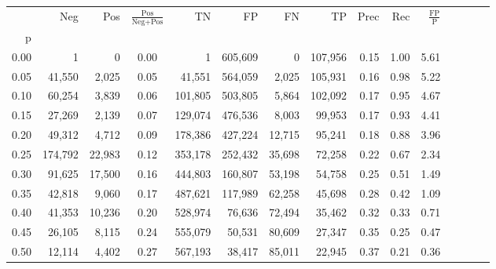 \begin{tabular}{rrrcrrrrrrrrrrr}
\toprule
{} &      Neg &     Pos & $\frac{\text{Pos}}{\text{Neg}+\text{Pos}}$ &       TN &       FP &       FN &       TP &  Prec &   Rec & $\frac{\text{FP}}{\text{P}}$ \\
p    &          &         &                                            &          &          &          &          &       &       &                              \\
\midrule
0.00 &        1 &       0 &                                       0.00 &        1 &  605,609 &        0 &  107,956 &  0.15 &  1.00 &                         5.61 \\
0.05 &   41,550 &   2,025 &                                       0.05 &   41,551 &  564,059 &    2,025 &  105,931 &  0.16 &  0.98 &                         5.22 \\
0.10 &   60,254 &   3,839 &                                       0.06 &  101,805 &  503,805 &    5,864 &  102,092 &  0.17 &  0.95 &                         4.67 \\
0.15 &   27,269 &   2,139 &                                       0.07 &  129,074 &  476,536 &    8,003 &   99,953 &  0.17 &  0.93 &                         4.41 \\
0.20 &   49,312 &   4,712 &                                       0.09 &  178,386 &  427,224 &   12,715 &   95,241 &  0.18 &  0.88 &                         3.96 \\
0.25 &  174,792 &  22,983 &                                       0.12 &  353,178 &  252,432 &   35,698 &   72,258 &  0.22 &  0.67 &                         2.34 \\
0.30 &   91,625 &  17,500 &                                       0.16 &  444,803 &  160,807 &   53,198 &   54,758 &  0.25 &  0.51 &                         1.49 \\
0.35 &   42,818 &   9,060 &                                       0.17 &  487,621 &  117,989 &   62,258 &   45,698 &  0.28 &  0.42 &                         1.09 \\
0.40 &   41,353 &  10,236 &                                       0.20 &  528,974 &   76,636 &   72,494 &   35,462 &  0.32 &  0.33 &                         0.71 \\
0.45 &   26,105 &   8,115 &                                       0.24 &  555,079 &   50,531 &   80,609 &   27,347 &  0.35 &  0.25 &                         0.47 \\
0.50 &   12,114 &   4,402 &                                       0.27 &  567,193 &   38,417 &   85,011 &   22,945 &  0.37 &  0.21 &                         0.36 \\

\end{tabular}
